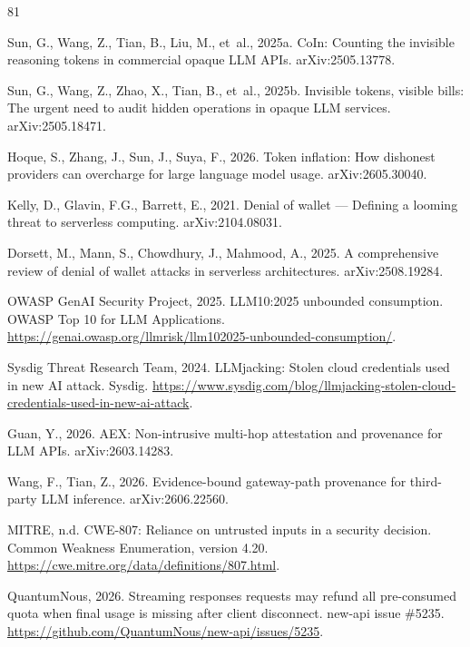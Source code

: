 \documentclass[final,5p,times,twocolumn,number]{elsarticle}
\begin{document}

\begin{thebibliography}{81}

Sun, G., Wang, Z., Tian, B., Liu, M., et~al., 2025a. CoIn: Counting the invisible
reasoning tokens in commercial opaque LLM APIs. arXiv:2505.13778.

Sun, G., Wang, Z., Zhao, X., Tian, B., et~al., 2025b. Invisible tokens, visible bills:
The urgent need to audit hidden operations in opaque LLM services. arXiv:2505.18471.

Hoque, S., Zhang, J., Sun, J., Suya, F., 2026. Token inflation: How dishonest providers
can overcharge for large language model usage. arXiv:2605.30040.

Kelly, D., Glavin, F.G., Barrett, E., 2021. Denial of wallet --- Defining a looming
threat to serverless computing. arXiv:2104.08031.

Dorsett, M., Mann, S., Chowdhury, J., Mahmood, A., 2025. A comprehensive review of
denial of wallet attacks in serverless architectures. arXiv:2508.19284.

OWASP GenAI Security Project, 2025. LLM10:2025 unbounded consumption. OWASP Top 10 for
LLM Applications.
\url{https://genai.owasp.org/llmrisk/llm102025-unbounded-consumption/}.

Sysdig Threat Research Team, 2024. LLMjacking: Stolen cloud credentials used in new AI
attack. Sysdig.
\url{https://www.sysdig.com/blog/llmjacking-stolen-cloud-credentials-used-in-new-ai-attack}.

Guan, Y., 2026. AEX: Non-intrusive multi-hop attestation and provenance for LLM APIs.
arXiv:2603.14283.

Wang, F., Tian, Z., 2026. Evidence-bound gateway-path provenance for third-party LLM
inference. arXiv:2606.22560.

MITRE, n.d. CWE-807: Reliance on untrusted inputs in a security decision. Common
Weakness Enumeration, version 4.20. \url{https://cwe.mitre.org/data/definitions/807.html}.

QuantumNous, 2026. Streaming responses requests may refund all pre-consumed quota when
final usage is missing after client disconnect. new-api issue \#5235.
\url{https://github.com/QuantumNous/new-api/issues/5235}.


\end{thebibliography}
\end{document}
